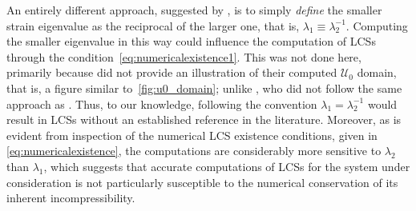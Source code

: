 An entirely different approach, suggested by \textcite{onu2015lcstool}, is to
simply \emph{define} the smaller strain eigenvalue as the reciprocal of the
larger one, that is, $\lambda_{1}\equiv\lambda_{2}^{-1}$. Computing the smaller
eigenvalue in this way could influence the computation of LCSs through
the condition~\eqref{eq:numericalexistence1}. This was not done here,
primarily because \citeauthor{onu2015lcstool} did not provide an illustration
of their computed $\mathcal{U}_{0}$ domain, that is, a figure similar
to~\cref{fig:u0_domain}; unlike \textcite{farazmand2012computing}, who
did not follow the same approach as \citeauthor{onu2015lcstool}. Thus, to our
knowledge, following the convention $\lambda_{1}=\lambda_{2}^{-1}$ would result
in LCSs without an established reference in the literature. Moreover, as is
evident from inspection of the numerical LCS existence conditions, given in
\cref{eq:numericalexistence}, the computations are considerably more sensitive
to $\lambda_{2}$ than $\lambda_{1}$, which suggests that accurate computations
of LCSs for the system under consideration is not particularly susceptible to
the numerical conservation of its inherent incompressibility.
